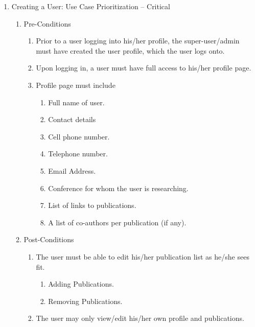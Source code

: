 \documentclass[10pt,a4paper]{exam}
\begin{document}
\noindent  

\begin{enumerate}
\item  Creating a User: Use Case Prioritization -- Critical

\begin{enumerate}
\item  Pre-Conditions

\begin{enumerate}
\item  Prior to a user logging into his/her profile, the super-user/admin must have created the user profile, which the user logs onto.

\item  Upon logging in, a user must have full access to his/her profile page.

\item  Profile page must include

\begin{enumerate}
\item  Full name of user.

\item  Contact details

\item  Cell phone number.

\item  Telephone number.

\item  Email Address.

\item  Conference for whom the user is researching.

\item  List of links to publications.

\item  A list of co-authors per publication (if any).
\end{enumerate}
\end{enumerate}

\item  Post-Conditions

\begin{enumerate}
\item  The user must be able to edit his/her publication list as he/she sees fit.

\begin{enumerate}
\item  Adding Publications.

\item  Removing Publications.
\end{enumerate}

\item  The user may only view/edit his/her own profile and publications.
\end{enumerate}
\end{enumerate}
\end{enumerate}
\end{document}

